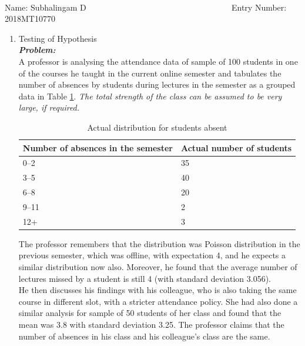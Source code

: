 \documentclass[12pt, oneside]{article}
\begin{document}
\setlength{\textheight}{8.5in}
\\
\vskip 0.5cm
\noindent Name: Subhalingam D~~ ~~~~~  ~~~~~ ~~~~ ~~~~~~~~~~~~~~~~ Entry Number: 2018MT10770~~~~~~~~~~~
\vskip 0.5cm

\begin{enumerate}

\item	Testing of Hypothesis \\
\textit{\textbf{Problem:}} \\
A professor is analysing the attendance data of sample of 100 students in one of the courses he taught in the current online semester and tabulates the number of absences by students during lectures in the semester as a grouped data in Table \ref{tab:q1_obs_ori}. \textit{The total strength of the class can be assumed to be very large, if required.}

\begin{table}[h]
    \centering
    \begin{tabular}{l|l}
        \hline
         \textbf{Number of absences in the semester} & \textbf{Actual number of students}  \\
         \hline
            0–2	& 35 \\
            3–5 & 40 \\
            6–8	& 20 \\ 
            9–11 & 2 \\
            12+ & 3 \\
        \hline
    \end{tabular}
    \caption{Actual distribution for students absent}
    \label{tab:q1_obs_ori}
\end{table}

The professor remembers that the distribution was Poisson distribution in the previous semester, which was offline, with expectation 4, and he expects a similar distribution now also.
Moreover, he found that the average number of lectures missed by a student is still 4 (with standard deviation 3.056).\\ He then discusses his findings with his colleague, who is also taking the same course in different slot, with a stricter attendance policy. She had also done a similar analysis for sample of 50 students of her class and found that the mean was 3.8 with standard deviation 3.25. The professor claims that the number of absences in his class and his colleague's class are the same.


\end{enumerate}
\end{document}
